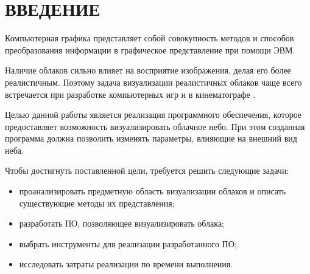 \chapter*{ВВЕДЕНИЕ}

Компьютерная графика представляет собой совокупность методов
и способов преобразования информации в графическое представление при
помощи ЭВМ.

Наличие облаков сильно влияет на восприятие изображения, делая его более реалистичным. Поэтому задача визуализации реалистичных облаков чаще всего встречается при разработке компьютерных игр и в кинематографе \cite{oz, hzd, frostbite}. 

Целью данной работы является реализация программного обеспечения, которое предоставляет возможность визуализировать облачное небо. При этом созданная программа должна позволить изменять параметры, влияющие на внешний вид неба.

Чтобы достигнуть поставленной цели, требуется решить следующие задачи:

\begin{itemize}
	\item проанализировать предметную область визуализации облаков и описать существующие методы их представления;
	\item разработать ПО, позволяющее визуализировать облака;
	\item выбрать инструменты для реализации разработанного ПО;
	\item исследовать затраты реализации по времени выполнения.
\end{itemize}